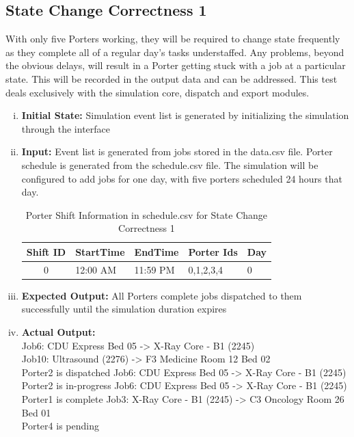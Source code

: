 \documentclass[paper=letter, fontsize=10pt]{scrartcl}
\numberwithin{equation}{section}		%
\numberwithin{figure}{section}			%
\numberwithin{table}{section}				%
\begin{document}
\subsection{State Change Correctness 1}
With only five Porters working, they will be required to change state frequently as they complete all of a regular day's tasks understaffed. Any problems, beyond the obvious delays, will result in a Porter getting stuck with a job at a particular state. This will be recorded in the output data and can be addressed. This test deals exclusively with the simulation core, dispatch and export modules.
\begin{enumerate}[(i)]
	\item \textbf{Initial State:} Simulation event list is generated by initializing the simulation through the interface
	\item \textbf{Input:} Event list is generated from jobs stored in the data.csv file. Porter schedule is generated from the schedule.csv file. The simulation will be configured to add jobs for one day, with five porters scheduled 24 hours that day.
	\begin{table}
	\caption{Porter Shift Information in schedule.csv for State Change Correctness 1}
	\begin{center}
    	\begin{tabular}{| c | l | l | l | l |}
    		\hline
        	Shift ID & StartTime & EndTime & Porter Ids & Day \\ \hline
  			0 & 12:00 AM & 11:59 PM & 0,1,2,3,4 & 0 \\ \hline
    	\end{tabular}
	\end{center}
	\end{table}
	\item \textbf{Expected Output:} All Porters complete jobs dispatched to them successfully until the simulation duration expires
	\item \textbf{Actual Output:}\\
	Job6: CDU Express Bed 05 -> X-Ray Core - B1 (2245)\\
Job10: Ultrasound (2276) -> F3 Medicine Room 12 Bed 02\\
Porter2 is dispatched Job6: CDU Express Bed 05 -> X-Ray Core - B1 (2245)\\
Porter2 is in-progress Job6: CDU Express Bed 05 -> X-Ray Core - B1 (2245)\\
Porter1 is complete Job3: X-Ray Core - B1 (2245) -> C3 Oncology Room 26 Bed 01\\
Porter4 is pending\\

\end{enumerate}
\end{document}
